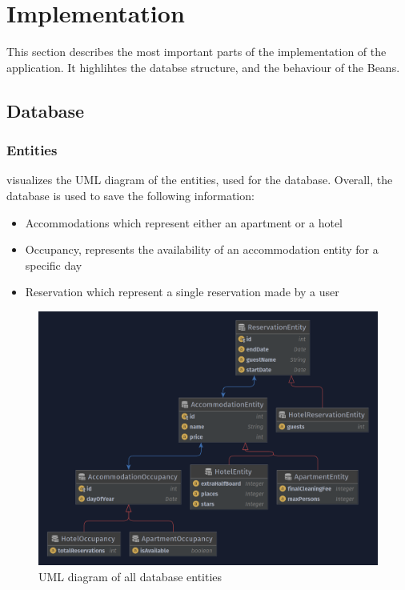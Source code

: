 \section{Implementation}\label{sec:02_impl}
This section describes the most important parts of the implementation of the application. It highlihtes the databse structure, and the behaviour of the Beans.


\subsection{Database}\label{sec:02_impl_db}


\subsubsection{Entities}\label{sec:02_impl_db_entities}
 visualizes the UML diagram of the entities, used for the database.
Overall, the database is used to save the following information:
\begin{itemize}
\item Accommodations which represent either an apartment or a hotel
\item Occupancy, represents the availability of an accommodation entity for a specific day
\item Reservation which represent a single reservation made by a user
\end{itemize}

\begin{figure}[h]
\centering
\includegraphics[scale=0.3]{images/02_impl/entities}
\caption{UML diagram of all database entities}
\label{fig:02_impl_db_entities}
\end{figure}

